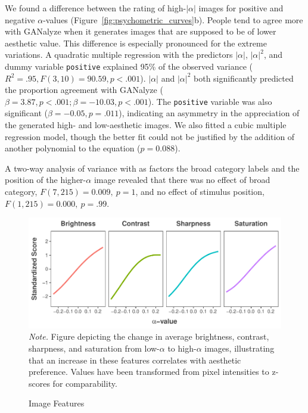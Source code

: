 \documentclass[../main.tex]{subfiles}
\begin{document}
We found a difference between the rating of high-$|\alpha|$ images for positive and negative $\alpha$-values (Figure~\ref{fig:psychometric_curves}b). People tend to agree more with GANalyze when it generates images that are supposed to be of lower aesthetic value. This difference is especially pronounced for the extreme variations. A quadratic multiple regression with the predictors $|\alpha|$, $|\alpha|^2$, and dummy variable \texttt{positive} explained 95\% of the observed variance ($R^2=.95, F(3,10)=90.59, p<.001$). $|\alpha|$ and $|\alpha|^2$ both significantly predicted the proportion agreement with GANalyze ($\beta=3.87, p<.001; \beta=-10.03, p<.001$). The \texttt{positive} variable was also significant ($\beta=-0.05, p=.011$), indicating an asymmetry in the appreciation of the generated high- and low-aesthetic images. We also fitted a cubic multiple regression model, though the better fit could not be justified by the addition of another polynomial to the equation ($p=0.088$).

A two-way analysis of variance with as factors the broad category labels and the position of the higher-$\alpha$ image revealed that there was no effect of broad category, $F(7,215)=0.009, \ p=1$, and no effect of stimulus position, $F(1,215)=0.000, \ p=.99$.

\begin{figure}[!t]
	\caption{Image Features}
	\label{fig:img_features}
	\includegraphics[width=1\linewidth]{images/results/img_features.pdf}
	{\textit{Note.} Figure depicting the change in average brightness, contrast, sharpness, and saturation from low-$\alpha$ to high-$\alpha$ images, illustrating that an increase in these features correlates with aesthetic preference. Values have been transformed from pixel intensities to z-scores for comparability.}
\end{figure}
\end{document}

